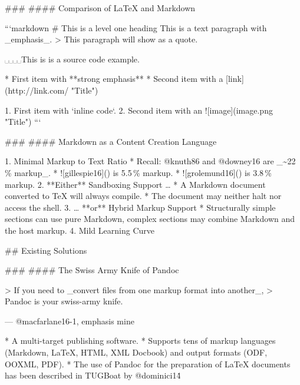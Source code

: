 \documentclass{beamer}
\begin{document}
\begin{darkframes}
\begin{frame}
\end{frame}
\begin{frame}

### \subsecname
#### Comparison of \LaTeX{} and Markdown

```markdown
# This is a level one heading
This is a text paragraph with _emphasis_.
> This paragraph will show as a quote.

␣␣␣␣This is is a source code example.

* First item with **strong emphasis**
* Second item with a [link](http://link.com/ "Title")

1. First item with `inline code`.
2. Second item with an ![image](image.png "Title")
```

\end{frame}
\begin{frame}

### \subsecname
#### Markdown as a Content Creation Language

  1. Minimal Markup to Text Ratio
    * Recall: @knuth86 and @downey16 are _\textasciitilde 22\,\% markup_.
    * ![gillespie16]() is 5.5\,\% markup.
    * ![grolemund16]() is 3.8\,\% markup.
  2. **Either** Sandboxing Support …
    * A Markdown document converted to \TeX{} will always compile.
    * The document may neither halt nor access the shell.
  3. … **or** Hybrid Markup Support
    * Structurally simple sections can use pure Markdown, complex sections
      may combine Markdown and the host markup.
  4. Mild Learning Curve

\end{frame}

## Existing Solutions

\begin{frame}

### \subsecname
#### The Swiss Army Knife of Pandoc

> If you need to _convert files from one markup format into another_,
> Pandoc is your swiss-army knife.

\hfill --- @macfarlane16-1, emphasis mine

  * A multi-target publishing software.
  * Supports tens of markup languages (Markdown, \LaTeX, HTML, XML Docbook)
    and output formats (ODF, OOXML, PDF).
  * The use of Pandoc for the preparation of \LaTeX{} documents has been
    described in TUGBoat by @dominici14\.

\end{frame}
\begin{frame}


\end{frame}
\end{darkframes}
\end{document}

